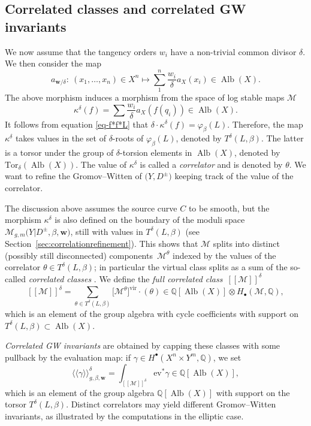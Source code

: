 \documentclass[pdftex]{sigma}
\newcommand{\Tor}{\mathrm{Tor}}
\newcommand{\vir}[1]{\big[#1\big]^\mathrm{vir}}
\newcommand{\fvir}[2]{[\![ #1 ]\!]^{#2}}
\newcommand{\ev}{\mathrm{ev}}
\newcommand{\Alb}{\operatorname{Alb}}
\newcommand{\QQ}{\mathbb{Q}}
\newcommand{\bfw}{ {\boldsymbol w} }
\newcommand{\M}{\mathcal{M}}
\numberwithin{equation}{section}
\theoremstyle{definition}
\begin{document}
\subsection{Correlated classes and correlated GW invariants} We now assume that the tangency orders $w_i$ have a non-trivial common divisor $\delta$. We then consider the map
\[
a_{\bfw/\delta}\colon\ (x_1,\dots,x_n)\in X^n\longmapsto\sum_1^n\frac{w_i}{\delta}a_X(x_i)\in \Alb(X).
 \]
The above morphism induces a morphism from the space of log stable maps $\M$
\[\kappa^\delta(f)=\sum \frac{w_i}{\delta}a_X(f(q_i))\in\Alb(X).\]
It follows from equation \eqref{eq-f*f*L} that
$\delta\cdot\kappa^\delta(f)=\varphi_\beta(L)$.
Therefore, the map $\kappa^\delta$ takes values in the set of $\delta$-roots of $\varphi_\beta(L)$, denoted by $T^\delta(L,\beta)$. The latter is a torsor under the group of $\delta$-torsion elements in $\Alb(X)$, denoted by $\Tor_\delta(\Alb(X))$.
The value of $\kappa^\delta$ is called a \textit{correlator} and is denoted by $\theta$.
We want to refine the Gromov--Witten of $\bigl(Y,D^{\pm}\bigr)$ keeping track of the value of the correlator.

The discussion above assumes the source curve $C$ to be smooth, but the morphism $\kappa^\delta$
is also defined on the boundary of the moduli space $\M_{g,m}\bigl(Y|D^{\pm},\beta,\bfw\bigr)$, still with values in $T^\delta(L,\beta)$ (see Section~\ref{sec:correlationrefinement}).
This shows that
 $\M$ splits into distinct (possibly still disconnected) components~$\M^\theta$ indexed by the values of the correlator $\theta\in T^\delta(L,\beta)$; in particular the virtual class splits as a sum of the so-called \textit{correlated classes} \smash{$\vir{\M^\theta}$}. We define the \textit{full correlated class}~$\fvir{\M}{\delta}$
\[ \fvir{\M}{\delta}=\sum_{\theta\in T^\delta(L,\beta)} \vir{\M^\theta}\cdot(\theta)\in \QQ[\Alb(X)]\otimes H_\bullet(\M,\QQ), \]
which is an element of the group algebra with cycle coefficients with support on $T^\delta(L,\beta)\subset\Alb(X)$.

\textit{Correlated GW invariants} are obtained by capping these classes with some pullback by the evaluation map: if $\gamma\in H^\bullet(X^n\times Y^m,\QQ)$, we set
\[ \langle\langle\gamma\rangle\rangle^\delta_{g,\beta,\bfw} = \int_{\fvir{\M}{\delta}}\ev^*\gamma \in\QQ[\Alb(X)], \]
which is an element of the group algebra $\QQ[\Alb(X)]$ with support on the torsor $T^\delta(L,\beta)$. Distinct correlators may yield different Gromov--Witten invariants, as illustrated by the computations in the elliptic case.
\end{document}
